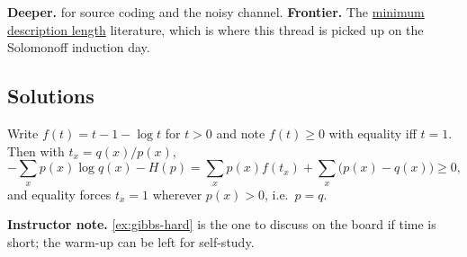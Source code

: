 \documentclass[11pt]{article}
\begin{document}
\textbf{Deeper.} \cite[ch.~5--6]{MacKay:03} for source coding and the noisy
channel. \textbf{Frontier.} The
\href{https://en.wikipedia.org/wiki/Minimum_description_length}{minimum description
length} literature, which is where this thread is picked up on the
Solomonoff induction day.

\begin{pdfonly}
\begin{solutionsonly}
\clearpage
\appendix
\section{Solutions}
\label{apx:solutions}
\end{solutionsonly}
\end{pdfonly}

\begin{solution}
Write $f(t) = t - 1 - \log t$ for $t > 0$ and note $f(t) \geq 0$ with equality
iff $t = 1$. Then with $t_x = q(x)/p(x)$,
\[ -\sum_x p(x) \log q(x) - H(p) = \sum_x p(x) f\!\left(t_x\right) +
   \sum_x \bigl(p(x) - q(x)\bigr) \geq 0, \]
and equality forces $t_x = 1$ wherever $p(x) > 0$, i.e.\ $p = q$.
\end{solution}

\begin{solutionsonly}
\textbf{Instructor note.} \cref{ex:gibbs-hard} is the one to discuss on
the board if time is short; the warm-up can be left for self-study.
\end{solutionsonly}



\end{document}
